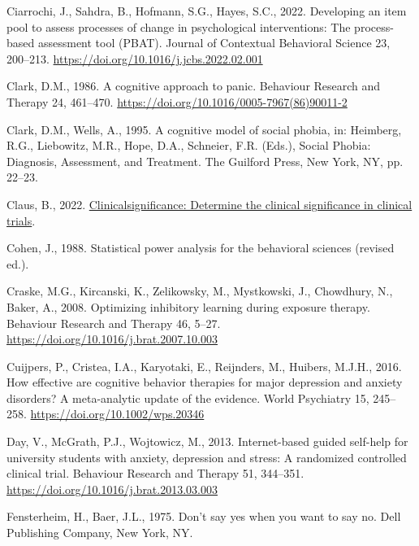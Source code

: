 \documentclass[preprint,
3p]{elsarticle} %
\newlength{\cslhangindent}
\newlength{\cslentryspacingunit} %
\newenvironment{CSLReferences}[2] %
 {%
  \setlength{\parindent}{0pt}
  \ifodd #1
  \let\oldpar\par
  \def\par{\hangindent=\cslhangindent\oldpar}
  \fi
  \setlength{\parskip}{#2\cslentryspacingunit}
 }%
 {}
\begin{document}
\begin{CSLReferences}{1}{0}
\leavevmode{}%
Ciarrochi, J., Sahdra, B., Hofmann, S.G., Hayes, S.C., 2022. Developing
an item pool to assess processes of change in psychological
interventions: The process-based assessment tool (PBAT). Journal of
Contextual Behavioral Science 23, 200--213.
\url{https://doi.org/10.1016/j.jcbs.2022.02.001}

\leavevmode{}%
Clark, D.M., 1986. {A cognitive approach to panic}. Behaviour Research
and Therapy 24, 461--470.
\url{https://doi.org/10.1016/0005-7967(86)90011-2}

\leavevmode{}%
Clark, D.M., Wells, A., 1995. {A cognitive model of social phobia}, in:
Heimberg, R.G., Liebowitz, M.R., Hope, D.A., Schneier, F.R. (Eds.),
Social Phobia: Diagnosis, Assessment, and Treatment. The Guilford Press,
New York, NY, pp. 22--23.

\leavevmode{}%
Claus, B., 2022.
\href{https://CRAN.R-project.org/package=clinicalsignificance}{Clinicalsignificance:
Determine the clinical significance in clinical trials}.

\leavevmode{}%
Cohen, J., 1988. Statistical power analysis for the behavioral sciences
(revised ed.).

\leavevmode{}%
Craske, M.G., Kircanski, K., Zelikowsky, M., Mystkowski, J., Chowdhury,
N., Baker, A., 2008. {Optimizing inhibitory learning during exposure
therapy}. Behaviour Research and Therapy 46, 5--27.
\url{https://doi.org/10.1016/j.brat.2007.10.003}

\leavevmode{}%
Cuijpers, P., Cristea, I.A., Karyotaki, E., Reijnders, M., Huibers,
M.J.H., 2016. How effective are cognitive behavior therapies for major
depression and anxiety disorders? A meta-analytic update of the
evidence. World Psychiatry 15, 245--258.
\url{https://doi.org/10.1002/wps.20346}

\leavevmode{}%
Day, V., McGrath, P.J., Wojtowicz, M., 2013. {Internet-based guided
self-help for university students with anxiety, depression and stress: A
randomized controlled clinical trial}. Behaviour Research and Therapy
51, 344--351. \url{https://doi.org/10.1016/j.brat.2013.03.003}

\leavevmode{}%
Fensterheim, H., Baer, J.L., 1975. {Don't say yes when you want to say
no}. Dell Publishing Company, New York, NY.


\end{CSLReferences}
\end{document}
